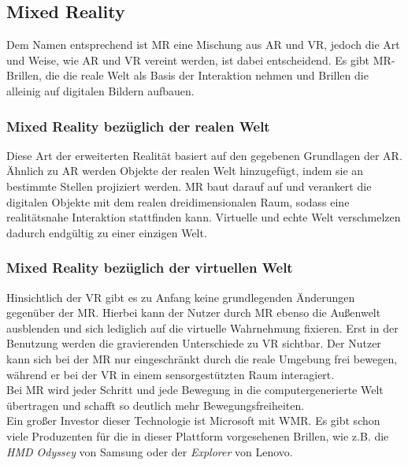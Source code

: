 \subsection*{Mixed Reality}
Dem Namen entsprechend ist \ac{MR} eine Mischung aus \acl{AR} und \acl{VR}, jedoch die Art und Weise, wie \acs{AR} und \acs{VR} vereint 
werden, ist dabei entscheidend. Es gibt \acs{MR}-Brillen, die die reale Welt als Basis der Interaktion nehmen und Brillen die alleinig 
auf digitalen Bildern aufbauen. \cite{mr.2018o}
\subsubsection*{Mixed Reality bezüglich der realen Welt}
Diese Art der erweiterten Realität basiert auf den gegebenen Grundlagen der \acs{AR}. Ähnlich zu \acl{AR} werden Objekte der realen Welt 
hinzugefügt, indem sie an bestimmte Stellen projiziert werden. \acl{MR} baut darauf auf und verankert die digitalen Objekte mit dem realen
dreidimensionalen Raum, sodass eine realitätsnahe Interaktion stattfinden kann. Virtuelle und echte Welt verschmelzen dadurch endgültig zu 
einer einzigen Welt. 

\subsubsection*{Mixed Reality bezüglich der virtuellen Welt}
Hinsichtlich der \acs{VR} gibt es zu Anfang keine grundlegenden Änderungen gegenüber der \acs{MR}. Hierbei kann der Nutzer durch 
\acs{MR} ebenso die Außenwelt ausblenden und sich lediglich auf die virtuelle Wahrnehmung fixieren. Erst in der Benutzung werden die 
gravierenden Unterschiede zu \acs{VR} sichtbar. Der Nutzer kann sich bei der \acs{MR} nur eingeschränkt durch 
die reale Umgebung frei bewegen, während er bei der \acl{VR} in einem sensorgestützten Raum interagiert. \cite{vr.2018n}
\\ 
Bei \acs{MR} wird jeder Schritt und jede Bewegung in die computergenerierte Welt übertragen und schafft so deutlich mehr Bewegungsfreiheiten. \cite{vr.2018n}
\\ 
\linebreak 
Ein großer Investor dieser Technologie ist Microsoft mit \ac{WMR}. \cite{vr.2018n}
Es gibt schon viele Produzenten für die in dieser Plattform vorgesehenen Brillen, wie z.B. die \textit{HMD Odyssey} von Samsung oder der 
\textit{Explorer} von Lenovo.

